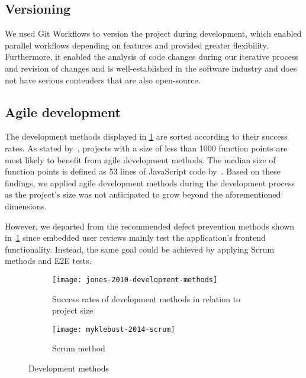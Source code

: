 \subsection{Versioning}\label{subsec:versioning}

We used Git Workflows to version the project during development, which enabled parallel workflows depending on features and provided greater flexibility.
Furthermore, it enabled the analysis of code changes during our iterative process and revision of changes and is well-established in the software industry and does not have serious contenders that are also open-source.

\subsection{Agile development}\label{subsec:agile-development}

The development methods displayed in \cref{fig:success-rates-development-methods} are sorted according to their success rates.
As stated by~\textcite[10-12]{jones_software_2010}, projects with a size of less than 1000 function points are most likely to benefit from agile development methods.
The median size of function points is defined as 53 lines of JavaScript code by~\textcite{qsm_function_2009}.
Based on these findings, we applied agile development methods during the development process as the project's size was not anticipated to grow beyond the aforementioned dimensions.

However, we departed from the recommended defect prevention methods shown in~\cref{fig:success-rates-development-methods} since embedded user reviews mainly test the application’s frontend functionality.
Instead, the same goal could be achieved by applying Scrum methods and \gls{E2E} tests.

\begin{figure}[t]
    \begin{subfigure}[b]{\textwidth}
        \centering
        \texttt{[image: jones-2010-development-methods]}
        \caption[Success rates of development methods]{Success rates of development methods in relation to project size~\autocite[11]{jones_software_2010}}
        \label{fig:success-rates-development-methods}
    \end{subfigure}
    \begin{subfigure}[b]{\textwidth}
        \centering
        \texttt{[image: myklebust-2014-scrum]}
        \caption[Scrum method]{Scrum method~\autocite[2]{myklebust_scrum_nodate}}
        \label{fig:scrum-method}
    \end{subfigure}
    \caption{Development methods}\label{fig:development-methods}
\end{figure}

